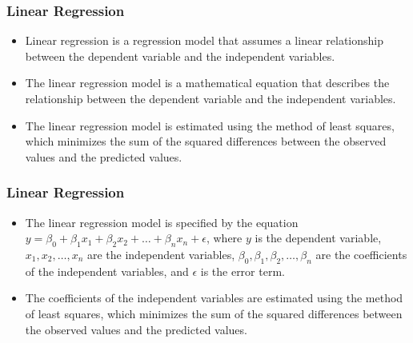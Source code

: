 \documentclass[serif, 9pt, aspectratio=32]{beamer}
\begin{document}
\begin{frame}
    \frametitle{Linear Regression}
    \begin{itemize}
        \setlength{\itemsep}{2em}
        \item Linear regression is a regression model that assumes a linear relationship between the dependent variable and the independent variables.
        \item The linear regression model is a mathematical equation that describes the relationship between the dependent variable and the independent variables.
        \item The linear regression model is estimated using the method of least squares, which minimizes the sum of the squared differences between the observed values and the predicted values.
    \end{itemize}
\end{frame}

\begin{frame}
    \frametitle{Linear Regression}
    \begin{itemize}
        \setlength{\itemsep}{2em}
        \item The linear regression model is specified by the equation $y = \beta_0 + \beta_1 x_1 + \beta_2 x_2 + \ldots + \beta_n x_n + \epsilon$, where $y$ is the dependent variable, $x_1, x_2, \ldots, x_n$ are the independent variables, $\beta_0, \beta_1, \beta_2, \ldots, \beta_n$ are the coefficients of the independent variables, and $\epsilon$ is the error term.
        \item The coefficients of the independent variables are estimated using the method of least squares, which minimizes the sum of the squared differences between the observed values and the predicted values.
    \end{itemize}
\end{frame}

\end{document}
